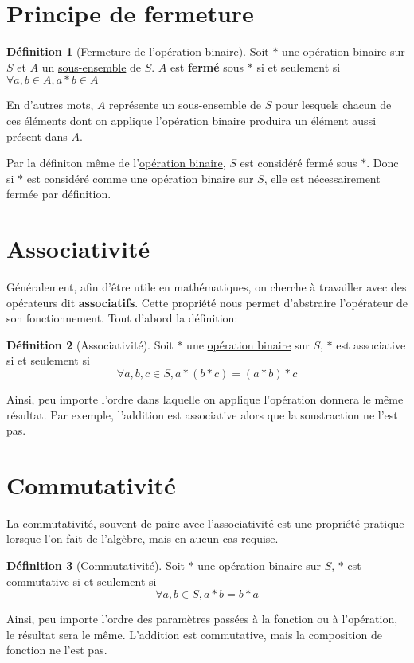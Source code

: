 \documentclass[12pt]{book}
\newcommand\todo[1]{\phantom{#1}}
\theoremstyle{definition}
\newtheorem{definition}{Définition}[section]
\begin{document}
\todo{Add Examples}

\section{Principe de fermeture}
\todo{Add lien avec topologie}
\begin{definition}[Fermeture de l'opération binaire]
    \label{def:fermeture}
    Soit $\ast$ une \hyperref[def:operation_binaire]{opération binaire} sur $S$ et $A$ un \hyperref[def:sous_ensemble]{sous-ensemble} de $S$. 
    $A$ est \textbf{fermé} sous $\ast$ si et seulement si $\forall a,b \in A, a \ast b \in A$
\end{definition}
En d'autres mots, $A$ représente un sous-ensemble de $S$ pour lesquels chacun de ces éléments dont on applique l'opération binaire
produira un élément aussi présent dans $A$.

Par la définiton même de l'\hyperref[def:operation_binaire]{opération binaire}, $S$ est considéré fermé sous $\ast$. Donc si $\ast$
est considéré comme une opération binaire sur $S$, elle est nécessairement fermée par définition.
\todo{Ajouter example table de Caley}

\section{Associativité}
Généralement, afin d'être utile en mathématiques, on cherche à travailler avec des opérateurs dit \textbf{associatifs}. Cette 
propriété nous permet d'abstraire l'opérateur de son fonctionnement. Tout d'abord la définition:
\begin{definition}[Associativité]
    \label{def:associativite}
    Soit $\ast$ une \hyperref[def:operation_binaire]{opération binaire} sur $S$, $\ast$ est associative si et seulement si 
    $$\forall a,b,c \in S, a \ast (b \ast c) = (a \ast b) \ast c$$
\end{definition}
Ainsi, peu importe l'ordre dans laquelle on applique l'opération donnera le même résultat. Par exemple, l'addition est associative alors
que la soustraction ne l'est pas.
\section{Commutativité}
La commutativité, souvent de paire avec l'associativité est une propriété pratique lorsque l'on fait de l'algèbre, mais en aucun cas requise.
\begin{definition}[Commutativité]
    \label{def:commutativite}
    Soit $\ast$ une \hyperref[def:operation_binaire]{opération binaire} sur $S$, $\ast$ est commutative si et seulement si 
    $$\forall a,b \in S, a \ast b = b \ast a$$
\end{definition}
Ainsi, peu importe l'ordre des paramètres passées à la fonction ou à l'opération, le résultat sera le même.
L'addition est commutative, mais la composition de fonction ne l'est pas.
\todo{Ajouter définition commute}
\end{document}
